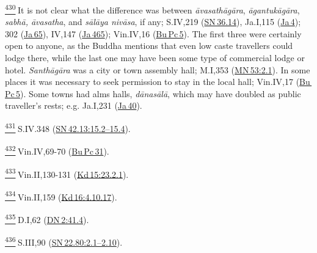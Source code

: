 \label{footprints_split_025.html_fn430}
\hyperref[footprints_split_012.htmlux5cux23fnref430]{\textsuperscript{430}} It
is not clear what the difference was between \emph{āvasathāgāra},
\emph{āgantukāgāra}, \emph{sabhā, āvasatha}, and \emph{sālāya nivāsa},
if any; S.IV,219
(\href{https://suttacentral.net/sn36.14/en/sujato}{SN\,36.14}), Ja.I,115
(\href{https://suttacentral.net/ja4}{Ja\,4}); 302
(\href{https://suttacentral.net/ja65}{Ja\,65}), IV,147
(\href{https://suttacentral.net/ja465}{Ja\,465}); Vin.IV,16
(\href{https://suttacentral.net/pli-tv-bu-vb-pc5/en/brahmali}{Bu\,Pc\,5}).
The first three were certainly open to anyone, as the Buddha mentions
that even low caste travellers could lodge there, while the last one may
have been some type of commercial lodge or hotel. \emph{Santhāgāra} was
a city or town assembly hall; M.I,353
(\href{https://suttacentral.net/mn53/en/sujato\#2.1}{MN\,53:2.1}). In
some places it was necessary to seek permission to stay in the local
hall; Vin.IV,17
(\href{https://suttacentral.net/pli-tv-bu-vb-pc5/en/brahmali}{Bu\,Pc\,5}).
Some towns had alms halls, \emph{dānasālā}, which may have doubled as
public traveller's rests; e.g. Ja.I,231
(\href{https://suttacentral.net/ja40}{Ja\,40}).

\label{footprints_split_025.html_fn431}
\hyperref[footprints_split_012.htmlux5cux23fnref431]{\textsuperscript{431}} S.IV.348
(\href{https://suttacentral.net/sn42.13/en/sujato\#15.2}{SN\,42.13:15.2--15.4}).

\label{footprints_split_025.html_fn432}
\hyperref[footprints_split_012.htmlux5cux23fnref432]{\textsuperscript{432}} Vin.IV,69-70
(\href{https://suttacentral.net/pli-tv-bu-vb-pc31/en/brahmali}{Bu\,Pc\,31}).

\label{footprints_split_025.html_fn433}
\hyperref[footprints_split_012.htmlux5cux23fnref433]{\textsuperscript{433}} Vin.II,130-131
(\href{https://suttacentral.net/pli-tv-kd15/en/brahmali\#23.2.1}{Kd\,15:23.2.1}).

\label{footprints_split_025.html_fn434}
\hyperref[footprints_split_012.htmlux5cux23fnref434]{\textsuperscript{434}} Vin.II,159
(\href{https://suttacentral.net/pli-tv-kd16/en/brahmali\#4.10.17}{Kd\,16:4.10.17}).

\label{footprints_split_025.html_fn435}
\hyperref[footprints_split_012.htmlux5cux23fnref435]{\textsuperscript{435}} D.I,62
(\href{https://suttacentral.net/dn2/en/sujato\#41.4}{DN\,2:41.4}).

\label{footprints_split_025.html_fn436}
\hyperref[footprints_split_012.htmlux5cux23fnref436]{\textsuperscript{436}} S.III,90
(\href{https://suttacentral.net/sn22.80/en/sujato\#2.1}{SN\,22.80:2.1--2.10}).

